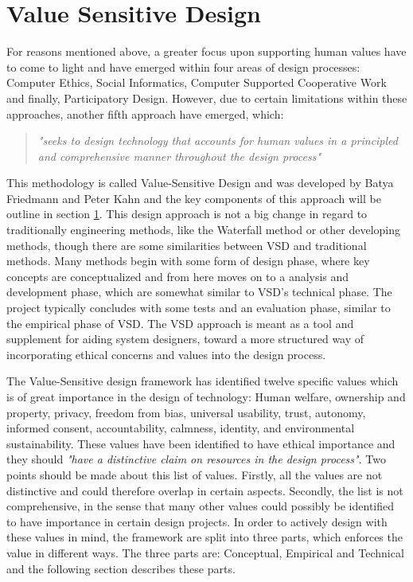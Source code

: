 \section{Value Sensitive Design}
\label{subsec:vsd_framework}
For reasons mentioned above, a greater focus upon supporting human values have to come to light and have emerged within four areas of design processes: Computer Ethics, Social Informatics, Computer Supported Cooperative Work and finally, Participatory Design\citep[p. 3]{FriedmanVSDandIS}. However, due to certain limitations within these approaches, another fifth approach have emerged, which: 
\begin{quotation}
\textit{"seeks to design technology that accounts for human values in a principled and comprehensive manner throughout the design process"} \citep[p. 1186]{HumanValuesEthicsAndDesign}
\end{quotation}

This methodology is called Value-Sensitive Design and was developed by Batya Friedmann and Peter Kahn and the key components of this approach will be outline in section \ref{subsec:vsd_framework}.\newline
This design approach is not a big change in regard to traditionally engineering methods, like the Waterfall method or other developing methods, though there are some similarities between VSD and traditional methods. Many methods begin with some form of design phase, where key concepts are conceptualized and from here moves on to a analysis and development phase, which are somewhat similar to VSD's technical phase. The project typically concludes with some tests and an evaluation phase, similar to the empirical phase of VSD\citep[p. 704]{IntegratingEthicsCummings}.\newline
The VSD approach is meant as a tool and supplement for aiding system designers, toward a more structured way of incorporating ethical concerns and values into the design process.\newline 

The Value-Sensitive design framework has identified twelve specific values which is of great importance in the design of technology: Human welfare, ownership and property, privacy, freedom from bias, universal usability, trust, autonomy, informed consent, accountability, calmness, identity, and environmental sustainability. These values have been identified to have ethical importance and they should \textit{"have a distinctive claim on resources in the design process"}\citep[p. 1187]{HumanValuesEthicsAndDesign}. Two points should be made about this list of values. Firstly, all the values are not distinctive and could therefore overlap in certain aspects. Secondly, the list is not comprehensive, in the sense that many other values could possibly be identified to have importance in certain design projects.\newline 
In order to actively design with these values in mind, the framework are split into three parts, which enforces the value in different ways. The three parts are: Conceptual, Empirical and Technical and the following section describes these parts. 

